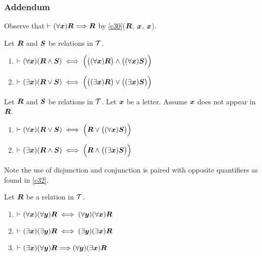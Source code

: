 \subsubsection{Addendum} Observe that $\vdash(\forall\boldsymbol{x})\boldsymbol{R}\Longrightarrow\boldsymbol{R}$
by \ref{c30}($\boldsymbol{R}$, $\boldsymbol{x}$, $\boldsymbol{x}$).

\begin{dc}\label{c32}%
Let $\boldsymbol{R}$ and $\boldsymbol{S}$ be relations in $\mathcal{T}$.
\begin{enumerate}
\item $\vdash(\forall\boldsymbol{x})(\boldsymbol{R}\land\boldsymbol{S})\iff\Bigl(\bigl((\forall\boldsymbol{x})\boldsymbol{R}\bigr)\land\bigl((\forall\boldsymbol{x})\boldsymbol{S}\bigr)\Bigr)$
\item $\vdash(\exists\boldsymbol{x})(\boldsymbol{R}\lor\boldsymbol{S})\iff\Bigl(\bigl((\exists\boldsymbol{x})\boldsymbol{R}\bigr)\lor\bigl((\exists\boldsymbol{x})\boldsymbol{S}\bigr)\Bigr)$
\end{enumerate}
\end{dc}

\begin{dc}\label{c33}%
Let $\boldsymbol{R}$ and $\boldsymbol{S}$ be relations in $\mathcal{T}$.
Let $\boldsymbol{x}$ be a letter. Assume $\boldsymbol{x}$ does not
appear in $\boldsymbol{R}$.
\begin{enumerate}
\item $\vdash(\forall\boldsymbol{x})(\boldsymbol{R}\lor\boldsymbol{S})\iff\Bigl(\boldsymbol{R}\lor\bigl((\forall\boldsymbol{x})\boldsymbol{S}\bigr)\Bigr)$
\item $\vdash(\exists\boldsymbol{x})(\boldsymbol{R}\land\boldsymbol{S})\iff\Bigl(\boldsymbol{R}\land\bigl((\exists\boldsymbol{x})\boldsymbol{S}\bigr)\Bigr)$
\end{enumerate}
Note the use of disjunction and conjunction is paired with opposite
quantifiers as found in \ref{c32}.
\end{dc}

\begin{dc}\label{c34}%
Let $\boldsymbol{R}$ be a relation in $\mathcal{T}$.
\begin{enumerate}
\item $\vdash(\forall\boldsymbol{x})(\forall\boldsymbol{y})\boldsymbol{R}\iff(\forall\boldsymbol{y})(\forall\boldsymbol{x})\boldsymbol{R}$
\item $\vdash(\exists\boldsymbol{x})(\exists\boldsymbol{y})\boldsymbol{R}\iff(\exists\boldsymbol{y})(\exists\boldsymbol{x})\boldsymbol{R}$
\item $\vdash(\exists\boldsymbol{x})(\forall\boldsymbol{y})\boldsymbol{R}\Longrightarrow(\forall\boldsymbol{y})(\exists\boldsymbol{x})\boldsymbol{R}$
\end{enumerate}
\end{dc}
